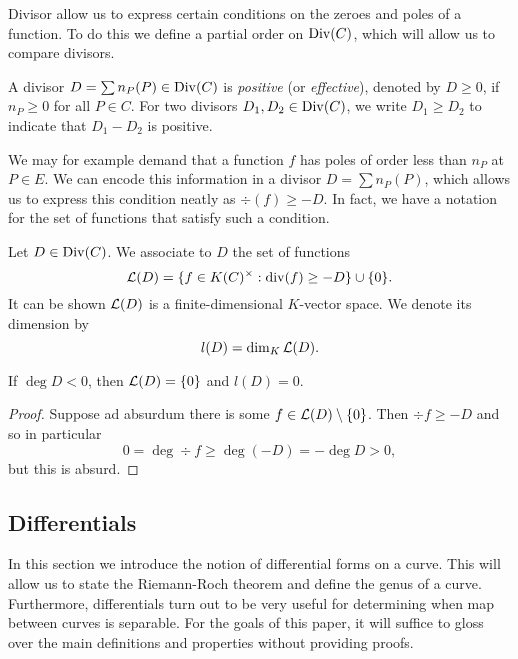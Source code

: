 Divisor allow us to express certain conditions on the zeroes and poles
of a function. To do this we define a partial order on $\operatorname{Div}(C)$, which will
allow us to compare divisors.

\begin{definition}
	A divisor $D = \sum n_P(P) \in \operatorname{Div}(C)$ is \emph{positive} (or
	\emph{effective}), denoted by
	$D \geq 0$, if $n_P \geq 0$ for all $P \in C$.
	For two divisors $D_1, D_2 \in \operatorname{Div}(C)$, we write $D_1 \geq D_2$
	to indicate that $D_1 - D_2$ is positive.
\end{definition}

We may for example demand that a function $f$
has poles of order less than $n_P$ at $P \in E$.
We can encode this information in a divisor $D = \sum n_P(P)$,
which allows us to express this condition neatly as
$\div(f) \geq -D$. In fact, we have a notation for the set
of functions that satisfy such a condition.

\begin{definition}
	Let $D \in \operatorname{Div}(C)$. We associate to $D$ the set of functions
	\begin{equation*}
		\mathcal{L}(D) = \{f \in K(C)^\times: \operatorname{div}(f) \geq -D\} \cup \{ 0 \}.
	\end{equation*}
	It can be shown $\mathcal{L}(D)$ is a finite-dimensional
	$K$-vector space. We denote its dimension by
	\begin{equation*}
		l(D) = \dim_K \mathcal{L}(D).
	\end{equation*}
\end{definition}

\begin{proposition}
	\label{prop:L-prop}
	If $\deg D < 0$, then $\mathcal{L}(D) = \{0\}$ and $l(D) = 0$.
\end{proposition}

\begin{proof}
	Suppose ad absurdum there is some $f \in \mathcal{L}(D) \setminus \{0\}$.
	Then $\div f \geq -D$ and so in particular
	\begin{equation*}
		0 = \deg \div f \geq \deg(-D) = -\deg D > 0,
	\end{equation*}
	but this is absurd.
\end{proof}

\subsection{Differentials}

In this section we introduce the notion of differential forms on a curve.
This will allow us to state the Riemann-Roch theorem and define the genus of a
curve. Furthermore, differentials turn out to be very useful for determining
when map between curves is separable.
For the goals of this paper, it will suffice to gloss over the main definitions
and properties without providing proofs.

